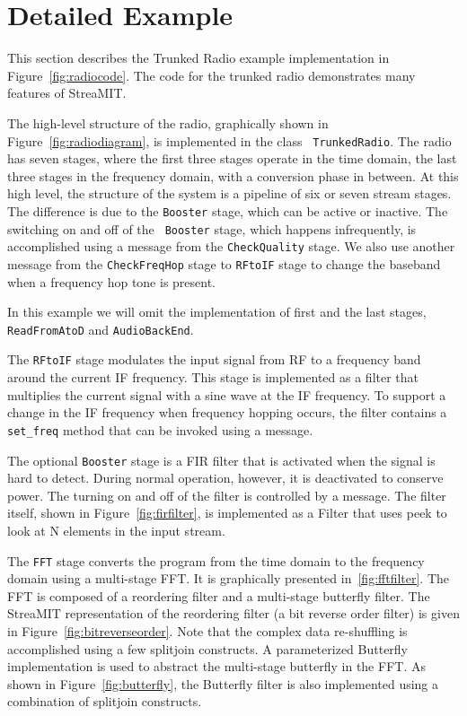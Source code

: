 \section{Detailed Example}
\label{sec:example}
This section describes the Trunked Radio example implementation in
Figure~\ref{fig:radiocode}. The code for the trunked radio
demonstrates many features of StreaMIT.

The high-level structure of the radio, graphically shown in
Figure~\ref{fig:radiodiagram}, is implemented in the class {\tt
TrunkedRadio}. The radio has seven stages, where the first three
stages operate in the time domain, the last three stages in the
frequency domain, with a conversion phase in between.  At this high
level, the structure of the system is a pipeline of six or seven
stream stages. The difference is due to the {\tt Booster} stage, which
can be active or inactive. The switching on and off of the {\tt
Booster} stage, which happens infrequently, is accomplished using a
message from the {\tt CheckQuality} stage. We also use another message
from the {\tt CheckFreqHop} stage to {\tt RFtoIF} stage to change the
baseband when a frequency hop tone is present.

In this example we will omit the implementation of first and the last
stages, {\tt ReadFromAtoD} and {\tt AudioBackEnd}.

The {\tt RFtoIF} stage modulates the input signal from RF to a
frequency band around the current IF frequency. This stage is
implemented as a filter that multiplies the current signal with a sine
wave at the IF frequency.  To support a change in the IF frequency
when frequency hopping occurs, the filter contains a {\tt set\_freq}
method that can be invoked using a message.

The optional {\tt Booster} stage is a FIR filter that is activated
when the signal is hard to detect. During normal operation, however,
it is deactivated to conserve power. The turning on and off of the
filter is controlled by a message.  The filter itself, shown in
Figure~\ref{fig:firfilter}, is implemented as a Filter that uses peek
to look at N elements in the input stream.

The {\tt FFT} stage converts the program from the time domain to the
frequency domain using a multi-stage FFT. It is graphically presented
in~\ref{fig:fftfilter}. The FFT is composed of a reordering filter and
a multi-stage butterfly filter. The StreaMIT representation of the
reordering filter (a bit reverse order filter) is given in
Figure~\ref{fig:bitreverseorder}. Note that the complex data
re-shuffling is accomplished using a few splitjoin constructs.  A
parameterized Butterfly implementation is used to abstract the
multi-stage butterfly in the FFT. As shown in
Figure~\ref{fig:butterfly}, the Butterfly filter is also implemented
using a combination of splitjoin constructs.

